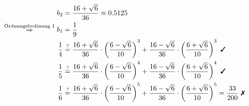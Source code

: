 \begin{align}
   b_2 &= \frac{16+\sqrt{6}}{36} \approx 0.5125\\
   \stackrel{\text{Ordnungsbedinung 1}}{\Rightarrow} b_1 &= \frac{1}{9}\\
    \frac{1}{4} &\stackrel{?}{=} \frac{16+\sqrt{6}}{36} \cdot \left (\frac{6-\sqrt{6}}{10} \right )^3 + \frac{16-\sqrt{6}}{36} \cdot \left (\frac{6+\sqrt{6}}{10} \right)^3 \text{ \cmark}\\
    \frac{1}{5} &\stackrel{?}{=} \frac{16+\sqrt{6}}{36} \cdot \left (\frac{6-\sqrt{6}}{10} \right )^4 + \frac{16-\sqrt{6}}{36} \cdot \left (\frac{6+\sqrt{6}}{10} \right)^4 \text{ \cmark}\\
    \frac{1}{6} &\stackrel{?}{=} \frac{16+\sqrt{6}}{36} \cdot \left (\frac{6-\sqrt{6}}{10} \right )^5 + \frac{16-\sqrt{6}}{36} \cdot \left (\frac{6+\sqrt{6}}{10} \right)^5 = \frac{33}{200} \text{ \xmark}
\end{align}
